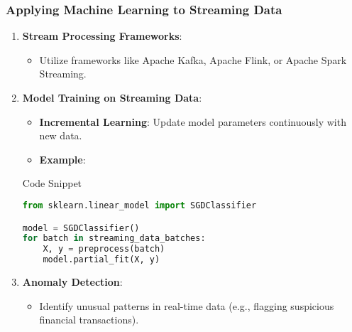 \documentclass[aspectratio=169]{beamer}
\begin{document}
\begin{frame}
    \frametitle{Applying Machine Learning to Streaming Data}
    \begin{enumerate}
        \item \textbf{Stream Processing Frameworks}:
        \begin{itemize}
            \item Utilize frameworks like Apache Kafka, Apache Flink, or Apache Spark Streaming.
        \end{itemize}
        
        \item \textbf{Model Training on Streaming Data}:
        \begin{itemize}
            \item \textbf{Incremental Learning}: Update model parameters continuously with new data.
            \item \textbf{Example}:
            \end{itemize}
            \begin{block}{Code Snippet}
                \begin{lstlisting}[language=Python]
from sklearn.linear_model import SGDClassifier

model = SGDClassifier()
for batch in streaming_data_batches:
    X, y = preprocess(batch)
    model.partial_fit(X, y)
                \end{lstlisting}
            \end{block}

        \item \textbf{Anomaly Detection}:
        \begin{itemize}
            \item Identify unusual patterns in real-time data (e.g., flagging suspicious financial transactions).
        \end{itemize}
    \end{enumerate}
\end{frame}
\end{document}
